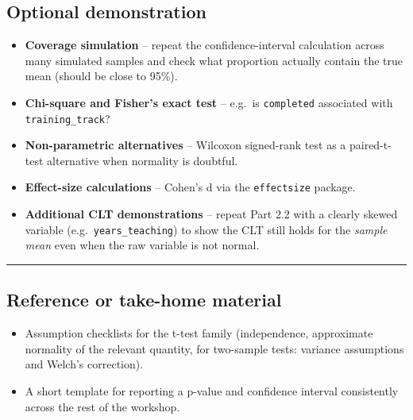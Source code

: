 \documentclass[11pt]{article}
\newenvironment{Shaded}{\begin{snugshade}}{\end{snugshade}}
\newcommand{\CommentTok}[1]{\textcolor[rgb]{0.56,0.35,0.01}{\textit{#1}}}
\newcommand{\FunctionTok}[1]{\textcolor[rgb]{0.13,0.29,0.53}{\textbf{#1}}}
\newcommand{\NormalTok}[1]{#1}
\newcommand{\SpecialCharTok}[1]{\textcolor[rgb]{0.81,0.36,0.00}{\textbf{#1}}}
\providecommand{\tightlist}{%
  \setlength{\itemsep}{0pt}\setlength{\parskip}{0pt}}
\begin{document}
\hypertarget{optional-demonstration}{%
\subsection{Optional demonstration}\label{optional-demonstration}}

\begin{itemize}
\tightlist
\item
  \textbf{Coverage simulation} -- repeat the confidence-interval
  calculation across many simulated samples and check what proportion
  actually contain the true mean (should be close to 95\%).
\item
  \textbf{Chi-square and Fisher's exact test} -- e.g.~is
  \texttt{completed} associated with \texttt{training\_track}?
\item
  \textbf{Non-parametric alternatives} -- Wilcoxon signed-rank test as a
  paired-t-test alternative when normality is doubtful.
\item
  \textbf{Effect-size calculations} -- Cohen's d via the
  \texttt{effectsize} package.
\item
  \textbf{Additional CLT demonstrations} -- repeat Part 2.2 with a
  clearly skewed variable (e.g.~\texttt{years\_teaching}) to show the
  CLT still holds for the \emph{sample mean} even when the raw variable
  is not normal.
\end{itemize}

\begin{Shaded}
\end{Shaded}

\begin{center}\rule{0.5\linewidth}{0.5pt}\end{center}

\hypertarget{reference-or-take-home-material}{%
\subsection{Reference or take-home
material}\label{reference-or-take-home-material}}

\begin{itemize}
\tightlist
\item
  Assumption checklists for the t-test family (independence, approximate
  normality of the relevant quantity, for two-sample tests: variance
  assumptions and Welch's correction).
\item
  A short template for reporting a p-value and confidence interval
  consistently across the rest of the workshop.
\end{itemize}
\end{document}

